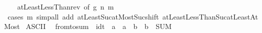 \begin{isabellebody}
%
\isadelimproof
\ \ %
\endisadelimproof
%
\isatagproof
{}\isamarkupfalse%
\ atLeastLessThan{\isacharunderscore}{\kern0pt}rev\ {\isacharbrackleft}{\kern0pt}of\ g\ n\ m{\isacharbrackright}{\kern0pt}\isanewline
\ \ \isamarkupfalse%
\ {\isacharparenleft}{\kern0pt}cases\ m{\isacharparenright}{\kern0pt}\ {\isacharparenleft}{\kern0pt}simp{\isacharunderscore}{\kern0pt}all\ add{\isacharcolon}{\kern0pt}\ atLeast{\isacharunderscore}{\kern0pt}Suc{\isacharunderscore}{\kern0pt}atMost{\isacharunderscore}{\kern0pt}Suc{\isacharunderscore}{\kern0pt}shift\ atLeastLessThanSuc{\isacharunderscore}{\kern0pt}atLeastAtMost{\isacharparenright}{\kern0pt}%
\endisatagproof
{\isafoldproof}%
%
\isadelimproof
\isanewline
%
\endisadelimproof
\isanewline
{}\isamarkupfalse%
%
\isadelimdocument
%
\endisadelimdocument
%
\isatagdocument
%
\isamarkuptrue%
%
\endisatagdocument
{\isafolddocument}%
%
\isadelimdocument
%
\endisadelimdocument
{}\isamarkupfalse%
\ {\isacharparenleft}{\kern0pt}ASCII{\isacharparenright}{\kern0pt}\isanewline
\ \ {\isachardoublequoteopen}{\isacharunderscore}{\kern0pt}from{\isacharunderscore}{\kern0pt}to{\isacharunderscore}{\kern0pt}sum{\isachardoublequoteclose}\ {\isacharcolon}{\kern0pt}{\isacharcolon}{\kern0pt}\ {\isachardoublequoteopen}idt\ {\isasymRightarrow}\ {\isacharprime}{\kern0pt}a\ {\isasymRightarrow}\ {\isacharprime}{\kern0pt}a\ {\isasymRightarrow}\ {\isacharprime}{\kern0pt}b\ {\isasymRightarrow}\ {\isacharprime}{\kern0pt}b{\isachardoublequoteclose}\ \ {\isacharparenleft}{\kern0pt}{\isachardoublequoteopen}{\isacharparenleft}{\kern0pt}SUM\ {\isacharunderscore}{\kern0pt}\ {\isacharequal}{\kern0pt}\ {\isacharunderscore}{\kern0pt}{\isachardot}{\kern0pt}{\isachardot}{\kern0pt}{\isacharunderscore}{\kern0pt}{\isachardot}{\kern0pt}{\isacharslash}{\kern0pt}\ {\isacharunderscore}{\kern0pt}{\isacharparenright}{\kern0pt}{\isachardoublequoteclose}\ {\isacharbrackleft}{\kern0pt}{}{\isacharcomma}{\kern0pt}{}{\isacharcomma}{\kern0pt}{}{\isacharcomma}{\kern0pt}{}{}{\isacharbrackright}{\kern0pt}\ {}{}{\isacharparenright}{\kern0pt}\isanewline

\end{isabellebody}
